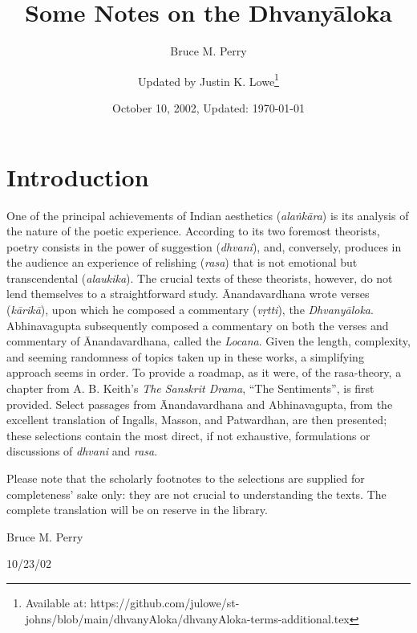 \documentclass[10pt]{article}
\title{Some Notes on the Dhvanyāloka}
\author{Bruce M. Perry \and Updated by Justin K. Lowe\footnote{Available at: https://github.com/julowe/st-johns/blob/main/dhvanyAloka/dhvanyAloka-terms-additional.tex} }
\date{October 10, 2002, Updated: \today}
\begin{document}

\maketitle

\section{Introduction}

 {\fontsize{12pt}{14pt}\selectfont
  One of the principal achievements of Indian aesthetics (\textit{alaṅkāra}) is its analysis of the nature of the poetic experience.
  According to its two foremost theorists, poetry consists in the power of suggestion (\textit{dhvani}), and, conversely, produces in the audience an experience of relishing (\textit{rasa}) that is not emotional but transcendental (\textit{alaukika}).
  The crucial texts of these theorists, however, do not lend themselves to a straightforward study.
  Ānandavardhana wrote verses (\textit{kārikā}), upon which he composed a commentary (\textit{vṛtti}), the \textit{Dhvanyāloka}.
  Abhinavagupta subsequently composed a commentary on both the verses and commentary of Ānandavardhana, called the \textit{Locana}.
  Given the length, complexity, and seeming randomness of topics taken up in these works, a simplifying approach seems in order.
  To provide a roadmap, as it were, of the rasa-theory, a chapter from A. B. Keith's \textit{The Sanskrit Drama}, ``The Sentiments'', is first provided.
  Select passages from Ānandavardhana and Abhinavagupta, from the excellent translation of Ingalls, Masson, and Patwardhan, are then presented; these selections contain the most direct, if not exhaustive, formulations or discussions of \textit{dhvani} and \textit{rasa}.

  Please note that the scholarly footnotes to the selections are supplied for completeness' sake only: they are not crucial to understanding the texts.
  The complete translation will be on reserve in the library.


  Bruce M. Perry

  10/23/02
 }



\end{document}
